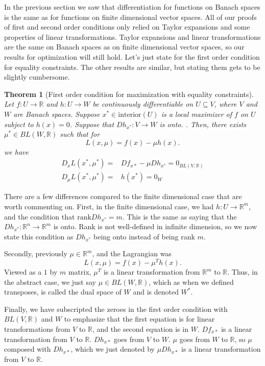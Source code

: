 \documentclass[12pt,reqno]{amsart}
\newtheorem{theorem}{Theorem}[section]
\theoremstyle{definition}
\def\R{\mathbb{R}}
\newcommand{\rank}{\mathrm{rank}}
\renewcommand{\to}{{\rightarrow}}
\begin{document}
In the previous section we saw that differentiation for functions on
Banach spaces is the same as for functions on finite dimensional
vector spaces. All of our proofs of first and second order conditions
only relied on Taylor expansions and some properties of linear
transformations. Taylor expansions and linear transformations are the
same on Banach spaces as on finite dimensional vector spaces, so our
results for optimization will still hold. Let's just state for the
first order condition for equality constraints. The other results are
similar, but stating them gets to be slightly cumbersome.
\begin{theorem}[First order condition for maximization with equality
  constraints] \label{thm:econv} Let $f:U \to \R$ and $h:U \to W$ be
  continuously differentiable on $U \subseteq V$, where 
  $V$ and $W$ are Banach spaces.  Suppose $x^* \in
  \mathrm{interior}(U)$ is a 
  local maximizer of $f$ on $U$ subject to
  $h(x) = 0$. Suppose that $Dh_{x^*}:V \to W$ is onto. 
. Then, there exists
  $\mu^* \in BL(W,\R)$ such that for
  \[ L(x,\mu) = f(x) - \mu h(x). \]
  we have
  \begin{align*}
     D_xL(x^*,\mu^*) = & Df_{x*} - \mu Dh_{x^*} = 0_{BL(V,\R)} \\
     D_\mu L(x^*,\mu^*) = & h(x^*) = 0_{W}
  \end{align*}
\end{theorem}
There are a few differences compared to the finite dimensional case
that are worth commenting on. First, in the finite dimensional case,
we had $h:U \to \R^m$, and the condition that $\rank Dh_{x^*} =
m$. This is the same as 
saying that the $Dh_{x^*}:\R^n \to \R^m$ is
onto. Rank is not well-defined in infinite dimension, so we now state
this condition as $Dh_{x^*}$ being onto instead of being rank
$m$. 

Secondly, previously $\mu \in \R^m$, and the Lagrangian was 
\[ L(x,\mu) = f(x) - \mu^T h(x). \] Viewed as a $1$ by $m$ matrix,
$\mu^T$ is a linear transformation from $\R^m$ to $\R$. Thus, in the
abstract case, we just say $\mu \in BL(W,\R)$, which as when we defined
transposes, is called the dual space of $W$ and is denoted $W^\ast$.

Finally, we have subscripted the zeroes in the first order condition
with $BL(V,\R)$ and $W$ to emphasize that the first equation is for
linear transformations from $V$ to $\R$, and the second equation is in
$W$. $Df_{x*}$ is a linear transformation from $V$ to
$\R$. $Dh_{x*}$ goes from $V$ to $W$. $\mu$ goes from $W$ to $\R$, so
$\mu$ composed with $Dh_{x*}$, which we just denoted by $\mu Dh_{x*}$
is a linear transformation from $V$ to $\R$.
\end{document}
